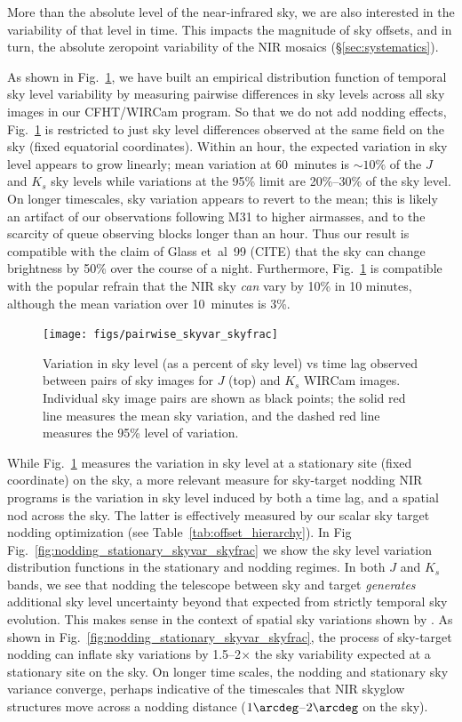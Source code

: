 \documentclass[iop]{emulateapj}
\newcommand{\etal}{et~al~}
\newcommand{\Fig}[1]{Fig.~\ref{fig:#1}}  %
\newcommand{\Tab}[1]{Table~\ref{tab:#1}}  %
\newcommand{\Sec}[1]{\S\ref{sec:#1}}  %
\begin{document}
More than the absolute level of the near-infrared sky, we are also interested in the variability of that level in time.
This impacts the magnitude of sky offsets, and in turn, the absolute zeropoint variability of the NIR mosaics (\Sec{systematics}).

As shown in \Fig{pairwise_skyvar}, we have built an empirical distribution function of temporal sky level variability by measuring pairwise differences in sky levels across all sky images in our CFHT/WIRCam program.
So that we do not add nodding effects, \Fig{pairwise_skyvar} is restricted to just sky level differences observed at the same field on the sky (fixed equatorial coordinates).
Within an hour, the expected variation in sky level appears to grow linearly; mean variation at 60~minutes is $\sim10\%$ of the $J$ and $K_s$ sky levels while variations at the 95\% limit are 20\%--30\% of the sky level.
On longer timescales, sky variation appears to revert to the mean; this is likely an artifact of our observations following M31 to higher airmasses, and to the scarcity of queue observing blocks longer than an hour.
Thus our result is compatible with the claim of Glass \etal 99 (CITE) that the sky can change brightness by 50\% over the course of a night.
Furthermore, \Fig{pairwise_skyvar} is compatible with the popular refrain that the NIR sky \emph{can} vary by 10\% in 10 minutes, although the mean variation over 10~minutes is 3\%.

\begin{figure}[t]
\centering
\texttt{[image: figs/pairwise\_skyvar\_skyfrac]}
\caption{Variation in sky level (as a percent of sky level) vs time lag observed between pairs of sky images for $J$ (top) and $K_s$ WIRCam images.
Individual sky image pairs are shown as black points; the solid red line measures the mean sky variation, and the dashed red line measures the 95\% level of variation.}
\label{fig:pairwise_skyvar}
\end{figure}

While \Fig{pairwise_skyvar} measures the variation in sky level at a stationary site (fixed coordinate) on the sky, a more relevant measure for sky-target nodding NIR programs is the variation in sky level induced by both a time lag, and a spatial nod across the sky.
The latter is effectively measured by our scalar sky target nodding optimization (see \Tab{offset_hierarchy}).
In Fig \Fig{nodding_stationary_skyvar_skyfrac} we show the sky level variation distribution functions in the stationary and nodding regimes.
In both $J$ and $K_s$ bands, we see that nodding the telescope between sky and target \emph{generates} additional sky level uncertainty beyond that expected from strictly temporal sky evolution.
This makes sense in the context of spatial sky variations shown by \cite{Adams:1996}.
As shown in \Fig{nodding_stationary_skyvar_skyfrac}, the process of sky-target nodding can inflate sky variations by 1.5--2$\times$ the sky variability expected at a stationary site on the sky.
On longer time scales, the nodding and stationary sky variance converge, perhaps indicative of the timescales that NIR skyglow structures move across a nodding distance ($1\arcdeg$--$2\arcdeg$ on the sky).
\end{document}
